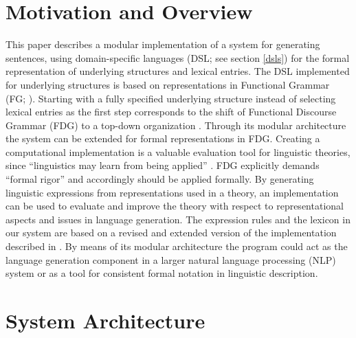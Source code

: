 \documentclass[a4paper, halfparskip, onecolumn, abstractoff, final]{scrartcl}
\begin{document}



\section{Motivation and Overview}
This paper describes a modular implementation of a system for generating sentences, using domain-specific languages (DSL; see section \ref{dsls}) for the formal representation of underlying structures and lexical entries. The DSL implemented for underlying structures is based on representations in Functional Grammar (FG; \citealt{Dik1997a}). Starting with a fully specified underlying structure instead of selecting lexical entries as the first step corresponds to the shift of Functional Discourse Grammar (FDG) to a top-down organization \citep[668]{HengeveldAndMackenzie2006}. Through its modular architecture the system can be extended for formal representations in FDG. Creating a computational implementation is a valuable evaluation tool for linguistic theories, since ``linguistics may learn from being applied'' \citep[4]{Bakker1994}. FDG explicitly demands ``formal rigor'' \citep[668]{HengeveldAndMackenzie2006} and accordingly should be applied formally. By generating linguistic expressions from representations used in a theory, an implementation can be used to evaluate and improve the theory with respect to representational aspects and issues in language generation. The expression rules and the lexicon in our system are based on a revised and extended version of the implementation described in \cite{Samuelsdorff1989}. By means of its modular architecture the program could act as the language generation component in a larger natural language processing (NLP) system or as a tool for consistent formal notation in linguistic description.

\section{System Architecture}
\end{document}
